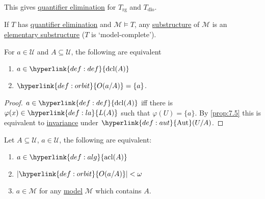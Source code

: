 \documentclass{article}
\let\models\vDash
\DeclareMathOperator{\Aut}{Aut}
\DeclareMathOperator{\dcl}{dcl}
\DeclareMathOperator{\acl}{acl}
\newcommand{\U}{\mathcal{U}}
\begin{document}
This gives \hyperlink{def:qe}{quantifier elimination} for $T_{\text{rg}}$ and $T_{\text{dlo}}$.
\begin{remark}
  If $T$ has \hyperlink{def:qe}{quantifier elimination} and $\mathcal{M} \models T$, any \hyperlink{def:subs}{substructure} of $\mathcal{M}$ is an \hyperlink{def:elsubs}{elementary substructure} ($T$ is `model-complete').
\end{remark}
\begin{nprop}\label{prop:7.11}
  For $a \in \mathcal{U}$ and $A \subseteq \mathcal{U}$, the following are equivalent
  \begin{enumerate}[label=(\roman*)]
    \item $a \in \hyperlink{def:def}{\dcl(A)}$
    \item $\hyperlink{def:orbit}{O(a/A)} = \{a\}$. %
  \end{enumerate}
\end{nprop}
\begin{proof}
  $a \in \hyperlink{def:def}{\dcl(A)}$ iff there is $\varphi(x) \in \hyperlink{def:la}{L(A)}$ such that $\varphi(U) = \{a\}$.
  By \cref{prop:7.5} this is equivalent to \hyperlink{def:inv}{invariance} under $\hyperlink{def:aut}{\Aut}(U/A)$.
\end{proof}
\begin{nthm}\label{thm:7.12}
  Let $A \subseteq \U$, $a \in \U$, the following are equivalent:
  \begin{enumerate}[label=(\roman*)]
    \item $a \in \hyperlink{def:alg}{\acl(A)}$
    \item $|\hyperlink{def:orbit}{O(a/A)}| < \omega$
    \item $a \in \mathcal{M}$ for any \hyperlink{def:model}{model} $\mathcal{M}$ which contains $A$.
  \end{enumerate}
\end{nthm}
\end{document}
